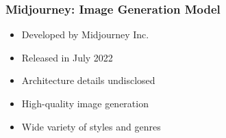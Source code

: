 

\begin{frame}[fragile]\frametitle{Midjourney: Image Generation Model}
    
    \begin{itemize}
        \item Developed by Midjourney Inc.
        \item Released in July 2022
        \item Architecture details undisclosed
        \item High-quality image generation
        \item Wide variety of styles and genres
    \end{itemize}
	
\end{frame}

